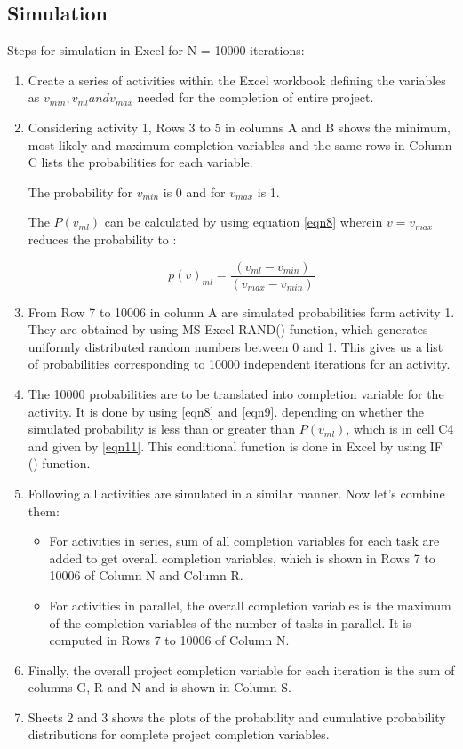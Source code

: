 \subsection{Simulation}
\label{4.5.2}
Steps for simulation in Excel for N = 10000 iterations:
\begin{enumerate}
	\item Create a series of activities within the Excel workbook defining the variables as $v_ {min}, v_ {ml} and v_ {max}$ needed for the completion of entire project.
\item Considering activity 1, Rows 3 to 5 in columns A and B shows the minimum, most likely and maximum completion variables and the same rows in Column C lists the probabilities for each variable.

The probability for $v_{min}$ is 0 and for $v_{max}$ is 1. 

The $P(v_{ml})$ can be calculated by using equation \ref{eqn8} wherein $v = v_{max}$ reduces the probability to :

\begin{equation}
p(v)_{ml}  = \frac{(v_{ml} - v_{min})}{  (v_{max} - v_{min}) } 
\label{eqn12}
\end{equation}

\item From Row 7 to 10006 in column A are simulated probabilities form activity 1. They are obtained by using MS-Excel RAND() function, which generates uniformly distributed random numbers between 0 and 1. This gives us a list of probabilities corresponding to 10000 independent iterations for an activity.

\item The 10000 probabilities are to be translated into completion variable for the activity. It is done by using \ref{eqn8} and  \ref{eqn9}. depending on whether the simulated probability is less than or greater than $P (v_ {ml}) $, which is in cell C4 and given by \ref{eqn11}. This conditional function is done in Excel by using IF () function.
\item Following all activities are simulated in a similar manner. Now let’s combine them: 
\begin{itemize}
	\item For activities in series, sum of all completion variables for each task are added to get overall completion variables, which is shown in Rows 7 to 10006 of Column N and Column R.
	\item For activities in parallel, the overall completion variables is the maximum of the completion variables of the number of tasks in parallel. It is computed in Rows 7 to 10006 of Column N.
\end{itemize}
\item Finally, the overall project completion variable for each iteration is the sum of columns G, R and N and is shown in Column S.
\item Sheets 2 and 3 shows the plots of the probability and cumulative probability distributions for complete project completion variables.
\end{enumerate}

